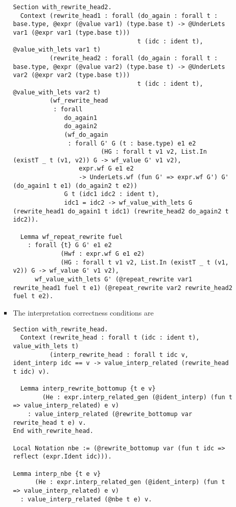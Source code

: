 \begin{itemize}
\begin{itemize}
\begin{itemize}
\begin{verbatim}
Section with_rewrite_head2.
  Context (rewrite_head1 : forall (do_again : forall t : base.type, @expr (@value var1) (type.base t) -> @UnderLets var1 (@expr var1 (type.base t)))
                                  t (idc : ident t), @value_with_lets var1 t)
          (rewrite_head2 : forall (do_again : forall t : base.type, @expr (@value var2) (type.base t) -> @UnderLets var2 (@expr var2 (type.base t)))
                                  t (idc : ident t), @value_with_lets var2 t)
          (wf_rewrite_head
           : forall
              do_again1
              do_again2
              (wf_do_again
               : forall G' G (t : base.type) e1 e2
                        (HG : forall t v1 v2, List.In (existT _ t (v1, v2)) G -> wf_value G' v1 v2),
                  expr.wf G e1 e2
                  -> UnderLets.wf (fun G' => expr.wf G') G' (do_again1 t e1) (do_again2 t e2))
              G t (idc1 idc2 : ident t),
              idc1 = idc2 -> wf_value_with_lets G (rewrite_head1 do_again1 t idc1) (rewrite_head2 do_again2 t idc2)).

  Lemma wf_repeat_rewrite fuel
    : forall {t} G G' e1 e2
             (Hwf : expr.wf G e1 e2)
             (HG : forall t v1 v2, List.In (existT _ t (v1, v2)) G -> wf_value G' v1 v2),
      wf_value_with_lets G' (@repeat_rewrite var1 rewrite_head1 fuel t e1) (@repeat_rewrite var2 rewrite_head2 fuel t e2).
\end{verbatim}
    \item
      The interpretation correctness conditions are

\begin{verbatim}
Section with_rewrite_head.
  Context (rewrite_head : forall t (idc : ident t), value_with_lets t)
          (interp_rewrite_head : forall t idc v, ident_interp idc == v -> value_interp_related (rewrite_head t idc) v).

  Lemma interp_rewrite_bottomup {t e v}
        (He : expr.interp_related_gen (@ident_interp) (fun t => value_interp_related) e v)
    : value_interp_related (@rewrite_bottomup var rewrite_head t e) v.
End with_rewrite_head.

Local Notation nbe := (@rewrite_bottomup var (fun t idc => reflect (expr.Ident idc))).

Lemma interp_nbe {t e v}
      (He : expr.interp_related_gen (@ident_interp) (fun t => value_interp_related) e v)
  : value_interp_related (@nbe t e) v.


\end{verbatim}
\end{itemize}
\end{itemize}
\end{itemize}
